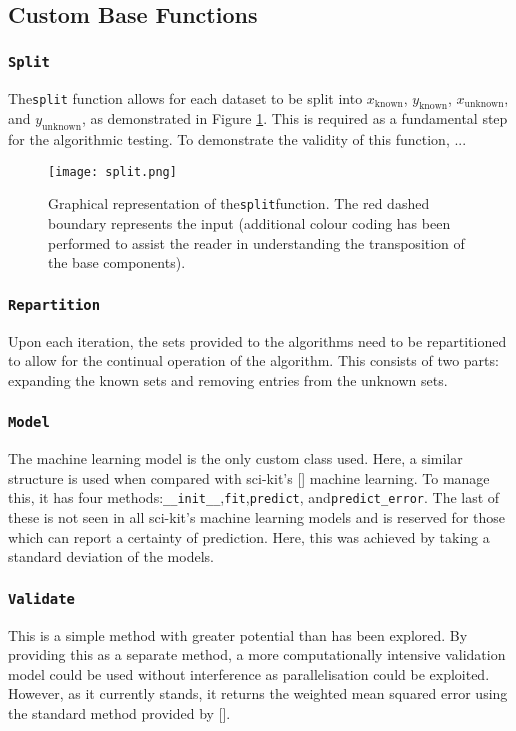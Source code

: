 \subsection{Custom Base Functions}
\subsubsection{\lstinline{Split}}
The\lstinline{split} function allows for each dataset to be split into $x_\mathrm{known}$, $y_\mathrm{known}$, $x_\mathrm{unknown}$, and $y_\mathrm{unknown}$, as demonstrated in Figure \ref{fig:Split}. This is required as a fundamental step for the algorithmic testing. To demonstrate the validity of this function, ...

\begin{figure}
    \begin{center}
        \texttt{[image: split.png]}
    \end{center}
    \caption{Graphical representation of the\lstinline{split}function. The red dashed boundary represents the input (additional colour coding has been performed to assist the reader in understanding the transposition of the base components).}
    \label{fig:Split}
\end{figure}


\subsubsection{\lstinline{Repartition}}
Upon each iteration, the sets provided to the algorithms need to be repartitioned to allow for the continual operation of the algorithm. This consists of two parts: expanding the known sets and removing entries from the unknown sets.
\\
\subsubsection{\lstinline{Model}}
The machine learning model is the only custom class used. Here, a similar structure is used when compared with sci-kit's [] machine learning. To manage this, it has four methods:\lstinline{__init__},\lstinline{fit},\lstinline{predict}, and\lstinline{predict_error}. The last of these is not seen in all sci-kit's machine learning models and is reserved for those which can report a certainty of prediction. Here, this was achieved by taking a standard deviation of the models.
\subsubsection{\lstinline{Validate}}
This is a simple method with greater potential than has been explored. By providing this as a separate method, a more computationally intensive validation model could be used without interference as parallelisation could be exploited. However, as it currently stands, it returns the weighted mean squared error using the standard method provided by [].
